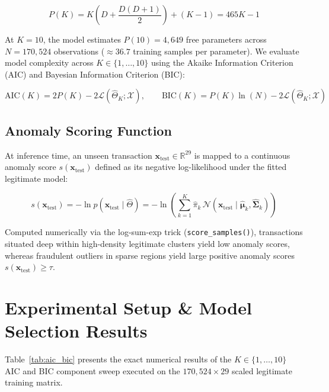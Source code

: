 \documentclass[11pt, a4paper]{article}
\begin{document}
\begin{equation}
P(K) = K \left( D + \frac{D(D+1)}{2} \right) + (K - 1) = 465K - 1
\end{equation}

At $K = 10$, the model estimates $P(10) = 4,649$ free parameters across $N = 170,524$ observations ($\approx 36.7$ training samples per parameter). We evaluate model complexity across $K \in \{1, \dots, 10\}$ using the Akaike Information Criterion (AIC) and Bayesian Information Criterion (BIC):

\begin{equation}
\text{AIC}(K) = 2P(K) - 2\mathcal{L}(\hat{\Theta}_K; \mathcal{X}), \qquad \text{BIC}(K) = P(K)\ln(N) - 2\mathcal{L}(\hat{\Theta}_K; \mathcal{X})
\end{equation}

\subsection{Anomaly Scoring Function}
At inference time, an unseen transaction $\mathbf{x}_{\text{test}} \in \mathbb{R}^{29}$ is mapped to a continuous anomaly score $s(\mathbf{x}_{\text{test}})$ defined as its negative log-likelihood under the fitted legitimate model:

\begin{equation}
s(\mathbf{x}_{\text{test}}) = -\ln p(\mathbf{x}_{\text{test}} \mid \hat{\Theta}) = -\ln \left( \sum_{k=1}^{K} \hat{\pi}_k \, \mathcal{N}(\mathbf{x}_{\text{test}} \mid \hat{\boldsymbol{\mu}}_k, \hat{\boldsymbol{\Sigma}}_k) \right)
\end{equation}

Computed numerically via the log-sum-exp trick (\texttt{score\_samples()}), transactions situated deep within high-density legitimate clusters yield low anomaly scores, whereas fraudulent outliers in sparse regions yield large positive anomaly scores $s(\mathbf{x}_{\text{test}}) \ge \tau$.

\section{Experimental Setup \& Model Selection Results}

Table~\ref{tab:aic_bic} presents the exact numerical results of the $K \in \{1, \dots, 10\}$ AIC and BIC component sweep executed on the $170,524 \times 29$ scaled legitimate training matrix.
\end{document}
